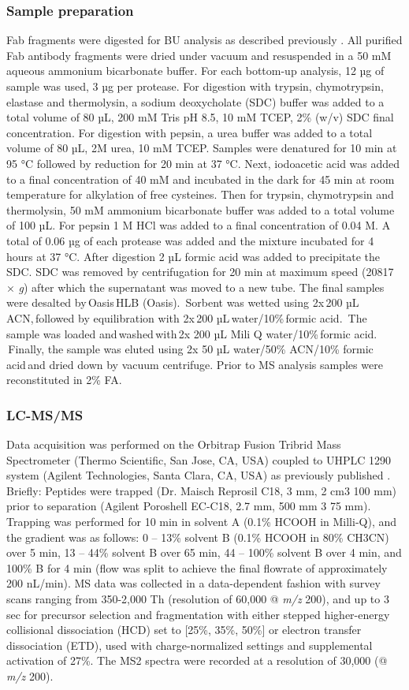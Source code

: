 \subsubsection{Sample preparation}
Fab fragments were digested for BU analysis as described previously \cite{bondt2021human}. All purified Fab antibody fragments were dried under vacuum and resuspended in a 50 mM aqueous ammonium bicarbonate buffer. For each bottom-up analysis, 12 µg of sample was used, 3 µg per protease. For digestion with trypsin, chymotrypsin, elastase and thermolysin, a sodium deoxycholate (SDC) buffer was added to a total volume of 80 µL, 200 mM Tris pH 8.5, 10 mM TCEP, 2\% (w/v) SDC final concentration. For digestion with pepsin, a urea buffer was added to a total volume of 80 µL, 2M urea, 10 mM TCEP. Samples were denatured for 10 min at 95 °C followed by reduction for 20 min at 37 °C. Next, iodoacetic acid was added to a final concentration of 40 mM and incubated in the dark for 45 min at room temperature for alkylation of free cysteines. Then for trypsin, chymotrypsin and thermolysin, 50 mM ammonium bicarbonate buffer was added to a total volume of 100 µL. For pepsin 1 M HCl was added to a final concentration of 0.04 M. A total of 0.06 µg of each protease was added and the mixture incubated for 4 hours at 37 °C. After digestion 2 µL formic acid was added to precipitate the SDC. SDC was removed by centrifugation for 20 min at maximum speed (20817 × \emph{g}) after which the supernatant was moved to a new tube. The final samples were desalted by Oasis HLB (Oasis).  Sorbent was wetted using 2x 200 µL ACN, followed by equilibration with 2x 200 µL water/10\% formic acid.  The sample was loaded and washed with 2x 200 µL Mili Q water/10\% formic acid.  Finally, the sample was eluted using 2x 50 µL water/50\% ACN/10\% formic acid and dried down by vacuum centrifuge. Prior to MS analysis samples were reconstituted in 2\% FA.

\subsubsection{LC-MS/MS}
Data acquisition was performed on the Orbitrap Fusion Tribrid Mass Spectrometer (Thermo Scientific, San Jose, CA, USA) coupled to UHPLC 1290 system (Agilent Technologies, Santa Clara, CA, USA) as previously published \cite{bondt2021human}. Briefly: Peptides were trapped (Dr. Maisch Reprosil C18, 3 mm, 2 cm3 100 mm) prior to separation (Agilent Poroshell EC-C18, 2.7 mm, 500 mm 3 75 mm). Trapping was performed for 10 min in solvent A (0.1\% HCOOH in Milli-Q), and the gradient was as follows: 0 – 13\% solvent B (0.1\% HCOOH in 80\% CH3CN) over 5 min, 13 – 44\% solvent B over 65 min, 44 – 100\% solvent B over 4 min, and 100\% B for 4 min (flow was split to achieve the final flowrate of approximately 200 nL/min). MS data was collected in a data-dependent fashion with survey scans ranging from 350-2,000 Th (resolution of 60,000 @ \emph{m/z} 200), and up to 3 sec for precursor selection and fragmentation with either stepped higher-energy collisional dissociation (HCD) set to [25\%, 35\%, 50\%] or electron transfer dissociation (ETD), used with charge-normalized settings and supplemental activation of 27\%. The MS2 spectra were recorded at a resolution of 30,000 (@ \emph{m/z} 200).

